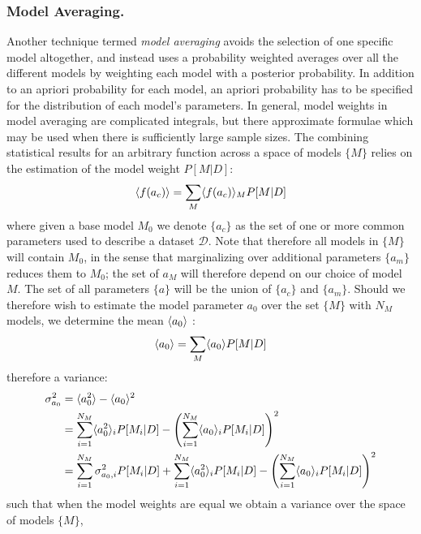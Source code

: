 \documentclass[10pt]{article}[draft]
\begin{document}
\subsubsection*{Model Averaging.}

 Another technique termed \emph{model averaging} avoids the selection of one specific model altogether, and instead uses a probability weighted averages over all the different models by weighting each model with a posterior probability. In addition to an apriori probability for each model, an apriori probability has to be specified for the distribution of each model’s parameters.  In general,  model weights in model averaging are complicated integrals, but there  approximate formulae which may be used when there is  sufficiently large sample sizes. The combining statistical results for an arbitrary function across a space of models $\{M\}$ relies on the estimation of the model weight $P[M|D]$:
\begin{equation}
	\inn{f(a_c)} = \sum_M 	\inn{f(a_c)}_M P[M|D]
\end{equation}
where given a base model $M_0$  we denote $\{a_c\}$ as the set of one or more common parameters used to describe a dataset $\mathcal{D}$. Note that therefore  all  models in $\{M\}$ will 
contain $M_0$, in the sense that marginalizing over additional parameters $\{a_m\}$ reduces them 
to $M_0$; the set of $a_M$ will therefore depend on our choice of model $M$.  The set of all parameters $\{a\}$ will be the union of $\{a_c\}$ and $\{a_m\}$. Should we therefore wish to estimate the model parameter $a_0$ over the set $\{M\}$ with $N_M$ models, we determine the mean $\inn{a_0}$ \cite{kass1995bayes}:
\begin{equation}
	\inn{a_0} = \sum_M  \inn{a_0}  P[M|D]
\end{equation}
therefore a variance:
\begin{equation}
\begin{split}
\sigma_{a_0}^2 & = 	\inn{a_0^2} - 	\inn{a_0}^2  \\
& =  \sum_{i=1}^{N_M}  \inn{a_0^2}_i  P[M_i|D] - \Biggl( \sum_{i=1}^{N_M}  \inn{a_0}_i  P[M_i|D] \Biggr)^2 \\
& =  \sum_{i=1}^{N_M} \sigma_{a_0,i}^2 P[M_i|D] +  \sum_{i=1}^{N_M}  \inn{a_0^2}_i  P[M_i|D] - \Biggl( \sum_{i=1}^{N_M}  \inn{a_0}_i  P[M_i|D] \Biggr)^2 \\
\end{split}
\end{equation}
such that when the model weights are equal we obtain a variance over the space of models $\{M\}$,
\end{document}
